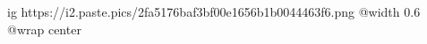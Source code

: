  
 
 
 
 

\ifcmt
  ig https://i2.paste.pics/2fa5176baf3bf00e1656b1b0044463f6.png
  @width 0.6
	@wrap center
\fi

